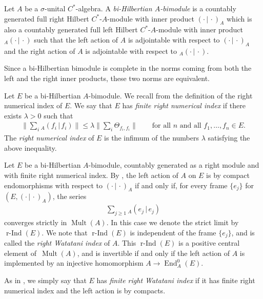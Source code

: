 \documentclass[pdftex]{sigma}
\numberwithin{equation}{section}
\DeclareMathOperator{\End}{End} %
\DeclareMathOperator{\Mult}{Mult} %
\newcommand{\rInd}{\operatorname{\mbox{$r$-$\operatorname{Ind}$}}}
\begin{document}
\begin{defn} \label{defn:bimod} Let $A$ be a $\sigma$-unital $C^*$-algebra. A \emph{bi-Hilbertian $A$-bimodule} is a countably generated full right Hilbert $C^*$-$A$-module with inner product $(\cdot \,|\, \cdot)_A$ which is also a countably generated full left Hilbert $C^*$-$A$-module with inner product ${_A(\cdot \,|\, \cdot)}$ such that the left action of $A$ is adjointable with respect to $(\cdot \,|\, \cdot)_A$ and the right action of $A$ is adjointable with respect to ${_A(\cdot \,|\, \cdot)}$.
\end{defn}

Since a bi-Hilbertian bimodule is complete in the norms coming from both the left and the right inner products, these two norms are equivalent.

Let $E$ be a bi-Hilbertian $A$-bimodule. We recall from \cite[Def\/inition~2.8]{KajPinWat} the def\/inition of the right numerical index of $E$. We say that $E$ has \emph{finite right numerical index} if there exists $\lambda > 0$ such that
\begin{gather*}\textstyle
\big\|\sum_i {_A(f_i \,|\, f_i)}\big\| \le \lambda \big\|\sum_i \Theta_{f_i, f_i}\big\|
 \qquad\text{for all $n$ and all $f_1, \dots, f_n \in E$.}
\end{gather*}
The \emph{right numerical index} of $E$ is the inf\/imum of the numbers $\lambda$ satisfying the above inequality.

Let $E$ be a bi-Hilbertian $A$-bimodule, countably generated as a right module and with f\/inite right numerical index. By \cite[Corollaries 2.24~and~2.28]{KajPinWat}, the left action of $A$ on $E$ is by compact endomorphisms with respect to $(\cdot \,|\, \cdot)_A$ if and only if, for every frame $\{e_j\}$ for $(E, (\cdot \,|\, \cdot)_A)$, the series
\begin{gather*}%
\sum_{j\geq 1}{}_A(e_j \,|\, e_j)
\end{gather*}
converges strictly in $\Mult(A)$. In this case we denote the strict limit by $\rInd(E)$. We note that $\rInd(E)$ is independent of the frame $\{e_j\}$, and is called the \emph{right Watatani index} of $A$. This $\rInd(E)$ is a positive central element of~$\Mult(A)$, and is invertible if and only if the left action of $A$ is implemented by an injective homomorphism $A \to \End_A^0(E)$.

As in \cite{KajPinWat}, we simply say that $E$ has \emph{finite right Watatani index} if it has f\/inite right numerical index and the left action is by compacts.
\end{document}
